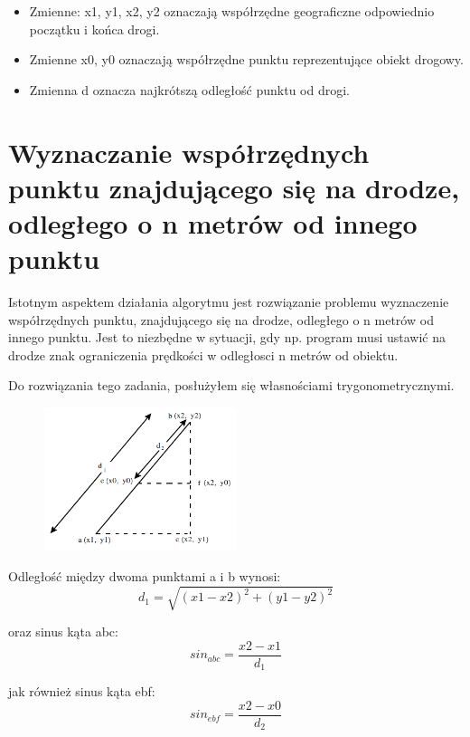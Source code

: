 \begin{itemize}
\item Zmienne: x1, y1, x2, y2 oznaczają współrzędne geograficzne odpowiednio początku i końca drogi.
\item Zmienne x0, y0 oznaczają współrzędne punktu reprezentujące obiekt drogowy.
\item Zmienna d oznacza najkrótszą odległość punktu od drogi.
\end{itemize}


\newpage
\section{Wyznaczanie współrzędnych punktu znajdującego się na drodze, odległego o n metrów od innego punktu}
\label{sec:pointCoordinatesFromAnotherPoint}

Istotnym aspektem działania algorytmu jest rozwiązanie problemu wyznaczenie współrzędnych punktu, znajdującego się na drodze, odległego o n metrów od innego punktu.  Jest to niezbędne w sytuacji, gdy np. program musi ustawić na drodze znak ograniczenia prędkości w odległosci n metrów od obiektu.

Do rozwiązania tego zadania, posłużyłem się własnościami trygonometrycznymi.


\begin{figure}[h]
\centering
\includegraphics[width=0.5\textwidth]{distance}
\end{figure}

Odległość między dwoma punktami a i b wynosi:
\begin{equation}
d_1 = \sqrt{(x1 - x2)^2 + (y1 - y2)^2}
\end{equation}\newline

oraz sinus kąta abc:
\begin{equation}
sin_{abc} = \frac{x2 - x1}{d_1}
\end{equation}\newline

jak również sinus kąta ebf:
\begin{equation}
sin_{ebf} = \frac{x2 - x0}{d_2}
\end{equation}\newline

